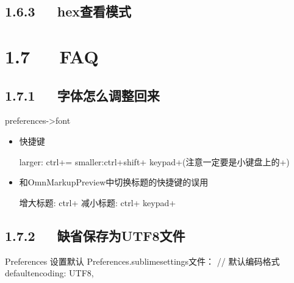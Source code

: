 \documentclass[letterpaper,12pt,english]{sphinxmanual}
\begin{document}
\subsection{1.6.3   hex查看模式}
\label{\detokenize{001software/001install/sublime:hex}}
\begin{sphinxVerbatim}[commandchars=\\\{\}]
    
  \PYGZbs{}\PYGZbs{}\PYGZbs{}\PYGZbs{}       
\end{sphinxVerbatim}


\section{1.7   FAQ}
\label{\detokenize{001software/001install/sublime:faq}}

\subsection{1.7.1   字体怎么调整回来}
\label{\detokenize{001software/001install/sublime:id6}}
preferences-\textgreater{}font
\begin{itemize}
\item {} 
快捷键

larger: ctrl+= smaller:ctrl+shift+ keypad+(注意一定要是小键盘上的+)

\item {} 
和OmnMarkupPreview中切换标题的快捷键的误用

增大标题: ctrl+ 减小标题: ctrl+ keypad+

\end{itemize}


\subsection{1.7.2   缺省保存为UTF8文件}
\label{\detokenize{001software/001install/sublime:utf8}}
\begin{sphinxVerbatim}[commandchars=\\\{\}]
Preferences 设置\PYGZhy{}默认
Preferences.sublime\PYGZhy{}settings文件：
// 默认编码格式
\PYGZdq{}default\PYGZus{}encoding\PYGZdq{}: \PYGZdq{}UTF\PYGZhy{}8\PYGZdq{},
\end{sphinxVerbatim}
\end{document}
